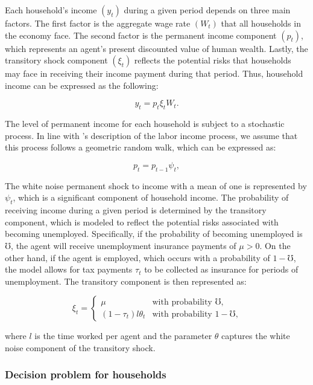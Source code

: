 \par Each household's income $(y_t)$ during a given period depends on three main factors. The first factor is the aggregate wage rate $(W_t)$ that all households in the economy face. The second factor is the permanent income component $(p_t)$, which represents an agent's present discounted value of human wealth. Lastly, the transitory shock component $(\xi_t)$ reflects the potential risks that households may face in receiving their income payment during that period. Thus, household income can be expressed as the following:

$$ y_t = p_t \xi_t W_t . $$

\par The level of permanent income for each household is subject to a stochastic process. In line with \cite{mf1957}'s description of the labor income process, we assume that this process follows a geometric random walk, which can be expressed as:

$$ p_t = p_{t-1} \psi_{t}, $$

\par The white noise permanent shock to income with a mean of one is represented by $\psi_t$, which is a significant component of household income. The probability of receiving income during a given period is determined by the transitory component, which is modeled to reflect the potential risks associated with becoming unemployed. Specifically, if the probability of becoming unemployed is $\mho$, the agent will receive unemployment insurance payments of $\mu > 0$. On the other hand, if the agent is employed, which occurs with a probability of $1 - \mho$, the model allows for tax payments $\tau_t$ to be collected as insurance for periods of unemployment. The transitory component is then represented as:

\begin{equation*}
\xi_t =
    \begin{cases}
        \mu & \text{with probability $\mho$,} \\
        (1-\tau_t) l \theta_t & \text{with probability $1-\mho$,}
    \end{cases}
\end{equation*}

\par where $l$ is the time worked per agent and the parameter $\theta$ captures the white noise component of the transitory shock.


\subsubsection{Decision problem for households}


